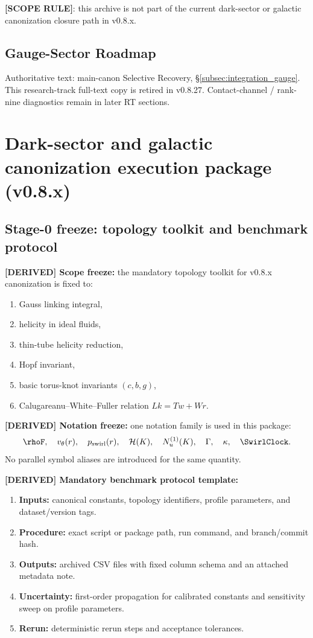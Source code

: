 \textbf{[SCOPE RULE]}: this archive is not part of the current dark-sector or galactic canonization closure path in v0.8.x.

\subsection{Gauge-Sector Roadmap}
\noindent
Authoritative text: main-canon Selective Recovery, \S\ref{subsec:integration_gauge}. This research-track full-text copy is retired in v0.8.27. Contact-channel / rank-nine diagnostics remain in later RT sections.

\section{Dark-sector and galactic canonization execution package (v0.8.x)}
\label{sec:dark-sector-execution-package}

\subsection{Stage-0 freeze: topology toolkit and benchmark protocol}
\textbf{[DERIVED] Scope freeze:} the mandatory topology toolkit for v0.8.x canonization is fixed to:
\begin{enumerate}
    \item Gauss linking integral,
    \item helicity in ideal fluids,
    \item thin-tube helicity reduction,
    \item Hopf invariant,
    \item basic torus-knot invariants $(c,b,g)$,
    \item Calugareanu--White--Fuller relation $Lk=Tw+Wr$.
\end{enumerate}

\textbf{[DERIVED] Notation freeze:} one notation family is used in this package:
\[
\rhoF,\quad v_\theta(r),\quad p_{\mathrm{swirl}}(r),\quad
\mathcal{H}(K),\quad N_u^{(1)}(K),\quad \Gamma,\quad \kappa,\quad \SwirlClock.
\]
No parallel symbol aliases are introduced for the same quantity.

\textbf{[DERIVED] Mandatory benchmark protocol template:}
\begin{enumerate}
    \item \textbf{Inputs:} canonical constants, topology identifiers, profile parameters, and dataset/version tags.
    \item \textbf{Procedure:} exact script or package path, run command, and branch/commit hash.
    \item \textbf{Outputs:} archived CSV files with fixed column schema and an attached metadata note.
    \item \textbf{Uncertainty:} first-order propagation for calibrated constants and sensitivity sweep on profile parameters.
    \item \textbf{Rerun:} deterministic rerun steps and acceptance tolerances.
\end{enumerate}

